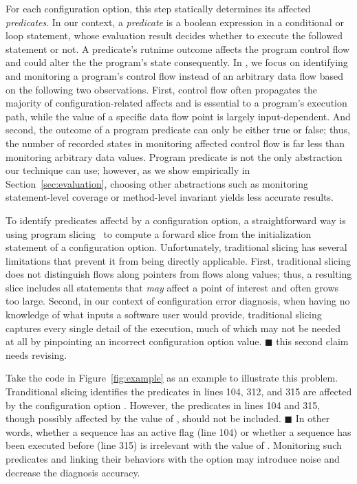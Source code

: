 For each configuration option, this step statically determines
its affected \textit{predicates}. In our context, a \textit{predicate}
is a boolean expression in a conditional or loop statement, whose evaluation result
decides whether to execute the followed statement or not.
A predicate's rutnime outcome affects the program control flow and could alter
the the program's state consequently. In \ourtool, we focus on identifying and monitoring a program's
control flow instead of an arbitrary data flow based on the
following two observations. First, control flow 
often propagates the majority of configuration-related affects
and is essential to a program's execution path, while
the value of a specific data flow point is largely input-dependent.
And second, the outcome of a program predicate can only be
either true or false; thus, the number of recorded states in monitoring
affected control flow is far less than monitoring arbitrary
data values.  Program predicate is not the only abstraction our technique can use;
however, as we show empirically in Section~\ref{sec:evaluation},
choosing other abstractions such as monitoring statement-level coverage
or method-level invariant yields less accurate results.


To identify predicates affectd by a configuration option, a straightforward
way is using program slicing~\cite{Horwitz:1988} to compute
a forward slice from the initialization statement of a
configuration option. Unfortunately, traditional slicing has
several limitations that prevent it from being directly applicable.
First, traditional slicing does not distinguish flows along
pointers from flows along values; thus, a resulting slice includes all statements that
\textit{may} affect a point of interest and often grows too large. Second,
in our context of configuration error diagnosis,
when having no knowledge of what inputs a software user would provide,
traditional slicing captures every single detail of the execution,
much of which may not be needed at all by pinpointing an incorrect
configuration option value. $\blacksquare$ this second claim needs revising.

Take the code in Figure~\ref{fig:example} as an example to illustrate
this problem.  Tranditional slicing identifies the predicates
in lines 104, 312, and 315 are affected by the configuration option .
However, the predicates in lines 104 and 315, though possibly
affected by the value of , should not be included. $\blacksquare$
In other words, whether a sequence has an active flag (line 104) or
whether a sequence has been executed before (line 315)
is irrelevant with the value of . Monitoring
such predicates and linking their behaviors with the 
option may introduce noise and decrease the diagnosis accuracy.

